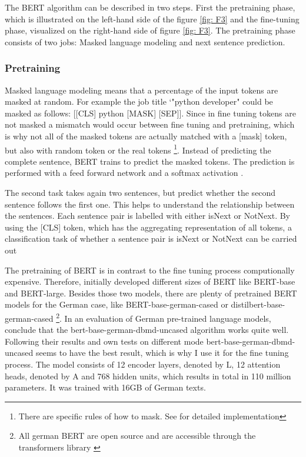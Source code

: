 \documentclass[12pt, a4paper, titlepage]{article}
\begin{document}
The \ac{BERT} algorithm can be described in two steps. First the pretraining phase, which is illustrated on the left-hand side of the figure \ref{fig: F3} and the fine-tuning phase, visualized on the right-hand side of figure \ref{fig: F3}. The pretraining phase consists of two jobs: Masked language modeling and next sentence prediction. 

\subsubsection*{Pretraining}
Masked language modeling means that a percentage of the input tokens are masked at random. For example the job title `"python developer" could be masked as follows: [[CLS] python [MASK] [SEP]]. Since in fine tuning tokens are not masked a mismatch would occur between fine tuning and pretraining, which is why not all of the masked tokens are actually matched with a [mask] token, but also with random token or the real tokens \footnote{There are specific rules of how to mask. See \citet{devlin2018} for detailed implementation}. Instead of predicting the complete sentence, BERT trains to predict the masked tokens. The prediction is performed with a feed forward network and a softmax activation \citep{devlin2018,ravichandiran2021}. 

The second task takes again two sentences, but predict whether the second sentence follows the first one. This helps to understand the relationship between the sentences. Each sentence pair is labelled with either isNext or NotNext. By using the [CLS] token, which has the aggregating representation of all tokens, a classification task of whether a sentence pair is isNext or NotNext can be carried out \citep{ravichandiran2021,devlin2018}

The pretraining of \ac{BERT} is in contrast to the fine tuning process computionally expensive. Therefore, \citet{devlin2018} initially developed different sizes of \ac{BERT} like \ac{BERT}-base and \ac{BERT}-large. Besides those two models, there are plenty of pretrained \ac{BERT} models for the German case, like \ac{BERT}-base-german-cased or distilbert-base-german-cased \footnote{All german \ac{BERT} are open source and are accessible through the transformers library \citep{wolf2020}}. In an evaluation of German pre-trained language models, \citep{assenmacher2021} conclude that the bert-base-german-dbmd-uncased algorithm works quite well. Following their results and own tests on different mode bert-base-german-dbmd-uncased seems to have the best result, which is why I use it for the fine tuning process. The model consists of 12 encoder layers, denoted by L, 12 attention heads, denoted by A and 768 hidden units, which results in total in 110 million parameters. It was trained with 16GB of German texts. 
\end{document}
